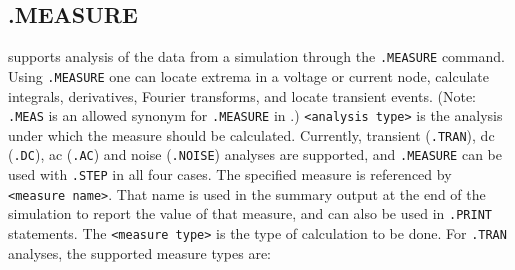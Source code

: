 \subsection{.MEASURE}
 
\label{measure}
\Xyce{} supports analysis of the data from a simulation through the
\texttt{.MEASURE} command.  Using \texttt{.MEASURE} one can locate extrema in a
voltage or current node, calculate integrals, derivatives, Fourier transforms,
and locate transient events. (Note: \texttt{.MEAS} is an allowed synonym for 
\texttt{.MEASURE} in \Xyce{}.)
\texttt{<analysis type>} is the analysis under which the measure should be calculated.  
Currently,  transient (\texttt{.TRAN}), dc (\texttt{.DC}), ac (\texttt{.AC})
and noise (\texttt{.NOISE}) analyses
are supported, and \texttt{.MEASURE} can be used with \texttt{.STEP} in all four cases.
The specified measure is referenced by \texttt{<measure name>}.  That name is used 
in the summary output at the end of the simulation to report the value of that
measure, and can also be used in \texttt{.PRINT} statements.  The
\texttt{<measure type>} is the type of calculation to be done.  For \texttt{.TRAN}
analyses, the supported measure types are:
